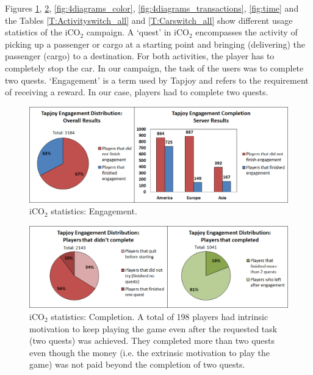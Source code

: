 \documentclass[preprint,authoryear,12pt]{elsarticle}
\begin{document}
Figures \ref{fig:engagement}, \ref{fig:completion}, \ref{fig:4diagrams_color}, \ref{fig:4diagrams_transactions},  \ref{fig:time} and the Tables \ref{T:Activityswitch_all} and \ref{T:Carswitch_all}  show different usage statistics of the iCO$_2$ campaign. A `quest' in iCO$_2$ encompasses the activity of picking up a passenger or cargo at a starting point and bringing (delivering) the passenger (cargo) to a destination. For both activities, the player has to completely stop the car. In our campaign, the task of the users was to complete two quests.
`Engagement' is a term used by Tapjoy and refers to the requirement of receiving a reward. In our case, players had to complete two quests.

\begin{figure}[htb]
	\begin{center}
		\includegraphics[width=.95\linewidth]{ijhcs14-img/engagement}
		\caption{iCO$_2$ statistics: Engagement.\label{fig:engagement}}
	\end{center}
\end{figure}

\begin{figure}[htb]
	\begin{center}
		\includegraphics[width=.95\linewidth]{ijhcs14-img/completion}
		\caption{iCO$_2$ statistics: Completion. A total of 198 players had intrinsic motivation to keep playing the game even after the requested task (two quests) was achieved. They completed more than two quests even though the money (i.e. the extrinsic motivation to play the game) was not paid beyond the completion of two quests. \label{fig:completion}}
	\end{center}
\end{figure}
\end{document}
